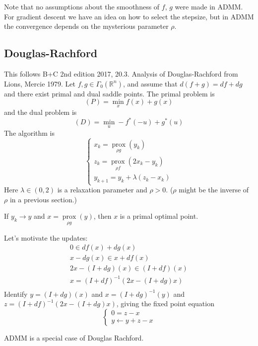 \documentclass[english, 11pt]{article}
\DeclareMathOperator*{\prox}{prox}
\begin{document}
 
 \begin{rem}
Note that no assumptions about the smoothness of $f$, $g$ were made in ADMM. For gradient descent we have an idea on how to select the stepsize, but in ADMM the convergence depends on the mysterious parameter $\rho$.
 \end{rem}
 
 
 \subsection{Douglas-Rachford}
This follows B+C 2nd edition 2017, 20.3. Analysis of Douglas-Rachford from Lions, Mercie 1979. Let $f,g \in \Gamma_0(\mathbb{R}^n)$, and assume that $d(f+g) = df + dg$ and there exist primal and dual saddle points. 
The primal problem is
\[
(P) = \min \limits_x f(x) + g(x)
\]
and the dual problem is
\[
(D) = \min \limits_u -f^*(-u) + g^*(u) 
\]
The algorithm is 
 \[
 \begin{cases}
 x_{k} = \prox \limits_{ \rho g}(y_k) \\
 z_{k} = \prox \limits_{\rho f}(2x_k - y_k) \\
 y_{k+1} = y_k + \lambda(z_{k} -x_k )
 \end{cases}
 \]
 Here $\lambda \in (0,2)$ is a relaxation parameter and $\rho>0$.
($\rho$ might be the inverse of $\rho$ in a previous section.)

 \begin{thrm}
 If $y_k \to y$ and $x = \prox \limits_{ \rho g}(y)$, then $x$ is a primal optimal point.
 \end{thrm}
 
 \begin{rem}
 Let's motivate the updates:
 \begin{align*}
 0 \in df(x) + dg(x) \\
 x - dg(x) \in x + df(x) \\
 2x - (I + dg)(x) \in (I + df)(x) \\
 x = (I + df)^{-1} (2x - (I+dg) x ) \\
 \end{align*}
 Identify $y = (I + dg)(x)$ and $x = (I + dg)^{-1}(y)$ and $z = (I + df)^{-1} (2x - (I+dg) x )$, giving the fixed point equation
 \[
 \begin{cases}
 0 = z-x \\
 y \leftarrow y+z -x
 \end{cases}
 \]
 \end{rem}

\begin{rem}
ADMM is a special case of Douglas Rachford.
\end{rem}
\end{document}
